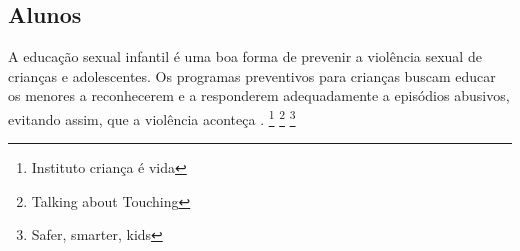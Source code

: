 








\subsection{Alunos}\label{ssec:alunos}

A educação sexual infantil é uma boa forma de prevenir a violência sexual de crianças e adolescentes. Os programas preventivos para crianças buscam educar os menores a reconhecerem e a responderem adequadamente a episódios abusivos, evitando assim, que a violência aconteça \cite{finkelhor2009prevention}. \footnote{Instituto criança é vida}
\footnote{Talking about Touching}
\footnote{Safer, smarter, kids}


